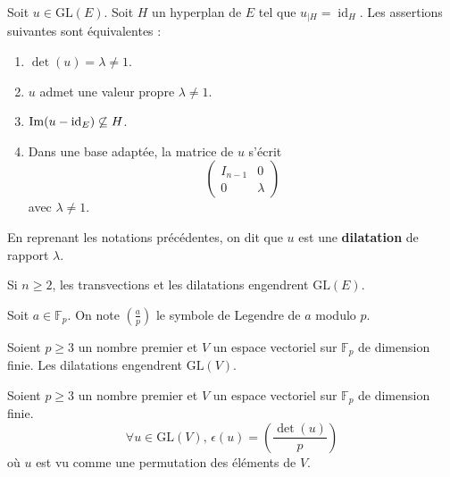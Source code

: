   \begin{proposition}
    Soit $u \in \mathrm{GL}(E)$. Soit $H$ un hyperplan de $E$ tel que $u_{|H} = \operatorname{id}_H$. Les assertions suivantes sont équivalentes :
    \begin{enumerate}[label=(\roman*)]
      \item $\det(u) = \lambda \neq 1$.
      \item $u$ admet une valeur propre $\lambda \neq 1$.
      \item $\mathrm{Im}(u - \operatorname{id}_E) \not\subseteq H$.
      \item Dans une base adaptée, la matrice de $u$ s'écrit
      \[
        \begin{pmatrix}
          I_{n-1} & 0 \\
          0 & \lambda
        \end{pmatrix}
      \]
      avec $\lambda \neq 1$.
    \end{enumerate}
  \end{proposition}

  \begin{definition}
    En reprenant les notations précédentes, on dit que $u$ est une \textbf{dilatation} de rapport $\lambda$.
  \end{definition}

  \begin{theorem}
    Si $n \geq 2$, les transvections et les dilatations engendrent $\mathrm{GL}(E)$.
  \end{theorem}


  \begin{notation}
    Soit $a \in \mathbb{F}_p$. On note $\left( \frac{a}{p} \right)$ le symbole de Legendre de $a$ modulo $p$.
  \end{notation}

  \begin{lemma}
    Soient $p \geq 3$ un nombre premier et $V$ un espace vectoriel sur $\mathbb{F}_p$ de dimension finie. Les dilatations engendrent $\mathrm{GL}(V)$.
  \end{lemma}


  \begin{application}
    Soient $p \geq 3$ un nombre premier et $V$ un espace vectoriel sur $\mathbb{F}_p$ de dimension finie.
    \[ \forall u \in \mathrm{GL}(V), \, \epsilon(u) = \left( \frac{\det(u)}{p} \right) \]
    où $u$ est vu comme une permutation des éléments de $V$.
  \end{application}

